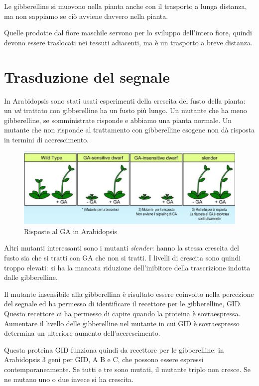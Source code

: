 \documentclass[a4paper,12pt]{book}
\begin{document}
Le gibberelline si muovono nella pianta anche con il trasporto a lunga distanza, ma non sappiamo se ciò avviene davvero nella pianta.

Quelle prodotte dal fiore maschile servono per lo sviluppo dell'intero fiore, quindi devono essere traslocati nei tessuti adiacenti, ma è un trasporto a breve distanza.

\section{Trasduzione del segnale}
In Arabidopsis sono stati usati esperimenti della crescita del fusto della pianta: un \emph{wt} trattato con gibberelline ha un fusto più lungo. Un mutante che ha meno gibberelline, se somministrate risponde e abbiamo una pianta normale. Un mutante che non risponde al trattamento con gibberelline esogene non dà risposta in termini di accrescimento.
\begin{figure}[H]
\centering
\includegraphics[scale=0.4]{immagini/gib.jpg}
\caption{Risposte al GA in Arabidopsis}
\end{figure}

Altri mutanti interessanti sono i mutanti \emph{slender}: hanno la stessa crescita del fusto sia che si tratti con GA che non si tratti. I livelli di crescita sono quindi troppo elevati: si ha la mancata riduzione dell'inibitore della trascrizione indotta dalle gibberelline. 

Il mutante insensibile alla gibberellina è risultato essere coinvolto nella percezione del segnale ed ha permesso di identificare il recettore per le gibberelline, GID. Questo recettore ci ha permesso di capire quando la proteina è sovraespressa. Aumentare il livello delle gibberelline nel mutante in cui GID è sovraespresso determina un ulteriore aumento dell'accrescimento.

Questa proteina GID funziona quindi da recettore per le gibberelline: in Arabidopsis 3 geni per GID, A B e C, che possono essere espressi contemporaneamente. Se tutti e tre sono mutati, il mutante triplo non cresce. Se ne mutano uno o due invece si ha crescita.
\end{document}
